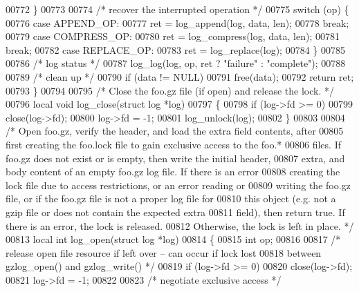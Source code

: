 \begin{DoxyCode}
{00772     \}
00773 
00774     \textcolor{comment}{/* recover the interrupted operation */}
00775     \textcolor{keywordflow}{switch} (op) \{
00776     \textcolor{keywordflow}{case} APPEND\_OP:
00777         ret = log\_append(log, data, len);
00778         \textcolor{keywordflow}{break};
00779     \textcolor{keywordflow}{case} COMPRESS\_OP:
00780         ret = log\_compress(log, data, len);
00781         \textcolor{keywordflow}{break};
00782     \textcolor{keywordflow}{case} REPLACE\_OP:
00783         ret = log\_replace(log);
00784     \}
00785 
00786     \textcolor{comment}{/* log status */}
00787     log\_log(log, op, ret ? \textcolor{stringliteral}{"failure"} : \textcolor{stringliteral}{"complete"});
00788 
00789     \textcolor{comment}{/* clean up */}
00790     \textcolor{keywordflow}{if} (data != NULL)
00791         free(data);
00792     \textcolor{keywordflow}{return} ret;
00793 \}
00794 
00795 \textcolor{comment}{/* Close the foo.gz file (if open) and release the lock. */}
00796 local \textcolor{keywordtype}{void} log\_close(\textcolor{keyword}{struct} log *log)
00797 \{
00798     \textcolor{keywordflow}{if} (log->fd >= 0)
00799         close(log->fd);
00800     log->fd = -1;
00801     log\_unlock(log);
00802 \}
00803 
00804 \textcolor{comment}{/* Open foo.gz, verify the header, and load the extra field contents, after}
00805 \textcolor{comment}{   first creating the foo.lock file to gain exclusive access to the foo.*}
00806 \textcolor{comment}{   files.  If foo.gz does not exist or is empty, then write the initial header,}
00807 \textcolor{comment}{   extra, and body content of an empty foo.gz log file.  If there is an error}
00808 \textcolor{comment}{   creating the lock file due to access restrictions, or an error reading or}
00809 \textcolor{comment}{   writing the foo.gz file, or if the foo.gz file is not a proper log file for}
00810 \textcolor{comment}{   this object (e.g. not a gzip file or does not contain the expected extra}
00811 \textcolor{comment}{   field), then return true.  If there is an error, the lock is released.}
00812 \textcolor{comment}{   Otherwise, the lock is left in place. */}
00813 local \textcolor{keywordtype}{int} log\_open(\textcolor{keyword}{struct} log *log)
00814 \{
00815     \textcolor{keywordtype}{int} op;
00816 
00817     \textcolor{comment}{/* release open file resource if left over -- can occur if lock lost}
00818 \textcolor{comment}{       between gzlog\_open() and gzlog\_write() */}
00819     \textcolor{keywordflow}{if} (log->fd >= 0)
00820         close(log->fd);
00821     log->fd = -1;
00822 
00823     \textcolor{comment}{/* negotiate exclusive access */}
}
\end{DoxyCode}
